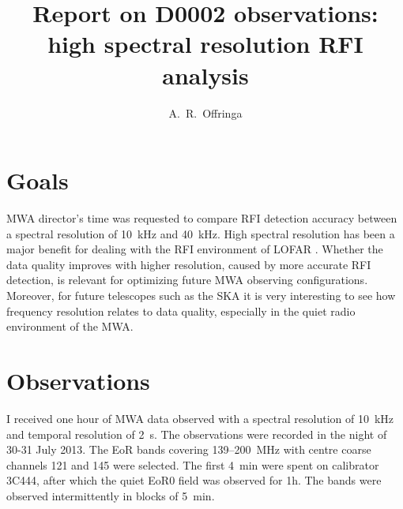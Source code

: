 \documentclass[a4paper,10pt]{article}
\title{Report on D0002 observations: high spectral resolution RFI analysis}
\author{A.~R.~Offringa}
\begin{document}
\label{firstpage}
\maketitle

\section{Goals}
MWA director's time was requested to compare RFI detection accuracy between a spectral resolution of 10~kHz and 40~kHz. High spectral resolution has been a major benefit for dealing with the RFI environment of LOFAR \citep{lofar-radio-environment}. Whether the data quality improves with higher resolution, caused by more accurate RFI detection, is relevant for optimizing future MWA observing configurations. Moreover, for future telescopes such as the SKA it is very interesting to see how frequency resolution relates to data quality, especially in the quiet radio environment of the MWA. 

\section{Observations}
I received one hour of MWA data observed with a spectral resolution of 10~kHz and temporal resolution of 2~s. The observations were recorded in the night of 30-31 July 2013. The EoR bands covering 139--200~MHz with centre coarse channels 121 and 145 were selected. The first 4~min were spent on calibrator 3C444, after which the quiet EoR0 field was observed for 1h. The bands were observed intermittently in blocks of 5~min.
\end{document}
